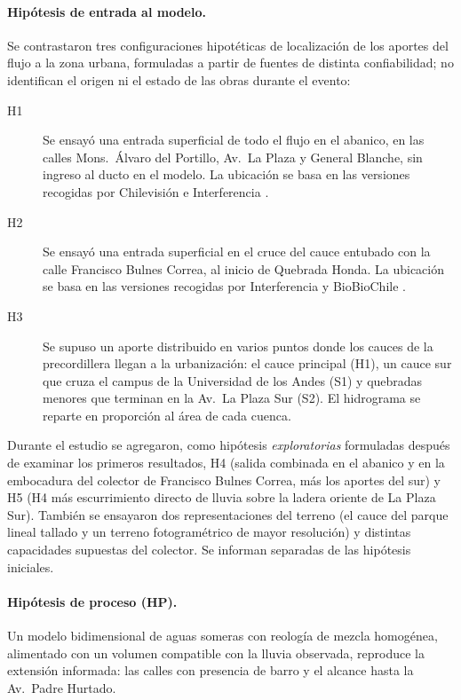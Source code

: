 \paragraph{Hipótesis de entrada al modelo.} Se contrastaron tres configuraciones hipotéticas de localización de los aportes del flujo a la zona urbana, formuladas a partir de fuentes de distinta confiabilidad; no identifican el origen ni el estado de las obras durante el evento:
\begin{description}
\item[H1] Se ensayó una entrada superficial de todo el flujo en el abanico, en las calles Mons.\ Álvaro del Portillo, Av.\ La Plaza y General Blanche, sin ingreso al ducto en el modelo. La ubicación se basa en las versiones recogidas por Chilevisión e Interferencia \citep{chilevision2026,interferencia2026}.
\item[H2] Se ensayó una entrada superficial en el cruce del cauce entubado con la calle Francisco Bulnes Correa, al inicio de Quebrada Honda. La ubicación se basa en las versiones recogidas por Interferencia y BioBioChile \citep{interferencia2026,biobio2026origen}.
\item[H3] Se supuso un aporte distribuido en varios puntos donde los cauces de la precordillera llegan a la urbanización: el cauce principal (H1), un cauce sur que cruza el campus de la Universidad de los Andes (S1) y quebradas menores que terminan en la Av.\ La Plaza Sur (S2). El hidrograma se reparte en proporción al área de cada cuenca.
\end{description}
Durante el estudio se agregaron, como hipótesis \emph{exploratorias} formuladas después de examinar los primeros resultados, H4 (salida combinada en el abanico y en la embocadura del colector de Francisco Bulnes Correa, más los aportes del sur) y H5 (H4 más escurrimiento directo de lluvia sobre la ladera oriente de La Plaza Sur). También se ensayaron dos representaciones del terreno (el cauce del parque lineal tallado y un terreno fotogramétrico de mayor resolución) y distintas capacidades supuestas del colector. Se informan separadas de las hipótesis iniciales.
\paragraph{Hipótesis de proceso (HP).} Un modelo bidimensional de aguas someras con reología de mezcla homogénea, alimentado con un volumen compatible con la lluvia observada, reproduce la extensión informada: las calles con presencia de barro y el alcance hasta la Av.\ Padre Hurtado.

